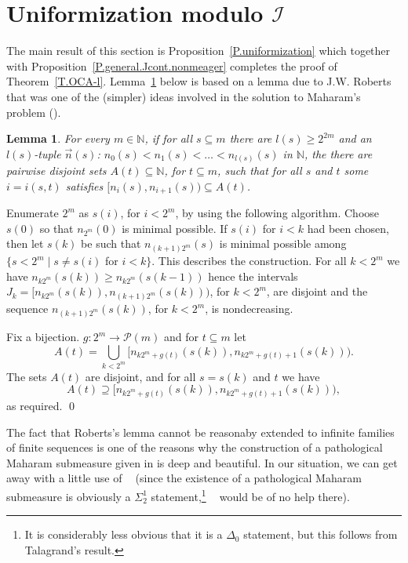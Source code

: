 \documentclass{amsart}
\makeatletter
\def\text{\mbox}
\newtheorem{lemma}[proposition]{Lemma}
\theoremstyle{definition}
\theoremstyle{remark}
\renewcommand{\proofname}{Proof}
\renewenvironment{proof}[1][\proofname]{\par
\let\oldqedsymbol\qedsymbol             %
  \normalfont
  \topsep6\p@\@plus6\p@ \trivlist
  \item[\hskip\labelsep\hskip\parindent\scshape
    #1\@addpunct{.}]\ignorespaces
}{%
  \qed\endtrivlist
\global\let\qedsymbol\oldqedsymbol      %
}
\newcommand{\cP}{\mathcal P}
\newcommand{\bbN}{\mathbb N}
\newcommand{\cI}{{\mathcal I}} %
\DeclareMathOperator{\MAsigma}{MA(\sigma-\text{linked})}
\numberwithin{claim}{subsection}
\makeatother
\begin{document}
\section{Uniformization modulo $\cI$}


The main result of this section is Proposition~\ref{P.uniformization}  which together with Proposition~\ref{P.general.Jcont.nonmeager} completes the proof of Theorem~\ref{T.OCA-l}. 
Lemma~\ref{L.Roberts} below is based on a lemma due to J.W. Roberts that was one of the (simpler) ideas involved in the solution to Maharam's problem (\cite{Tal:Maharam}). 

\begin{lemma}
	\label{L.Roberts}
	For every $m\in \bbN$, if for  all $s\subseteq m$ there are  $l(s)\geq 2^{2m}$  and an $l(s)$-tuple $\vec n(s)$: $n_0(s)<n_1(s)<\dots < n_{l(s)}(s)$ in $\bbN$, the there are pairwise disjoint sets $A(t)\subseteq \bbN$, for $t\subseteq m$, such that for all $s$ and $t$ some $i=i(s,t)$ satisfies $[n_i(s),n_{i+1}(s))\subseteq A(t)$. 
\end{lemma}

\begin{proof}
	Enumerate $2^m$ as $s(i)$, for $i<2^m$, by using the following algorithm. 
	Choose $s(0)$ so that $n_{2^m}(0)$ is minimal possible. If $s(i)$ for $i<k$ had been chosen, then let $s(k)$ be such that $n_{(k+1)2^m}(s)$ is minimal possible among $\{s<2^m\mid s\neq s(i)$ for $i<k\}$. This describes the construction. For all $k<2^m$ we have $n_{k 2^m}(s(k))\geq n_{k 2^m} (s(k-1))$ hence the intervals $J_{k}=[n_{k2^m}(s(k)), n_{(k+1) 2^m}(s(k)))$, for $k<2^m$,  are  disjoint and the sequence $n_{(k+1) 2^m}(s(k))$, for $k<2^m$,  is nondecreasing. 
	
	Fix a bijection. $g\colon 2^m\to \cP(m)$ and for $t\subseteq m$ let 
	\[
	A(t)=\bigcup_{k<2^m} [n_{k 2^m+g(t)}(s(k)), n_{k 2^m +g(t)+1} (s(k))). 
	\]
	The sets $A(t)$ are disjoint, and for all $s=s(k)$ and $t$ we have 
	\[
	A(t)\supseteq [n_{k 2^m+g(t)}(s(k)), n_{k 2^m +g(t)+1} (s(k)))	,
	\] 
	as required. 
\end{proof}

The fact that Roberts’s lemma cannot be reasonaby extended to infinite families of finite sequences is one of the reasons why the construction of a pathological Maharam submeasure given in \cite{Tal:Maharam} is deep and beautiful. In our situation, we can get away with a little use of $\MAsigma$ (since the existence of a pathological Maharam submeasure is obviously  a $\Sigma^1_2$ statement,\footnote{It is considerably less obvious that it is a $\Delta_0$ statement, but this follows from Talagrand’s result.} $\MAsigma$ would be of no help there). 
\end{document}
